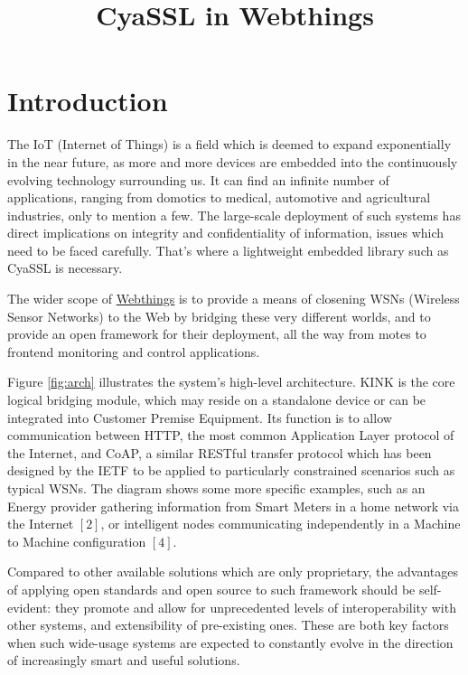 \documentclass[10pt]{article}
\title{\textbf{CyaSSL in Webthings}}
\author{}
\date{}
\begin{document}
\maketitle

\section{Introduction}

The IoT (Internet of Things) is a field which is deemed to expand exponentially in the near future, as more and more devices are embedded into the continuously evolving technology surrounding us. It can find an infinite number of applications, ranging from domotics to medical, automotive and agricultural industries, only to mention a few. The large-scale deployment of such systems has direct implications on integrity and confidentiality of information, issues which need to be faced carefully. That's where a lightweight embedded library such as CyaSSL is necessary.

The wider scope of \href{http://github.com/koanlogic/webthings}{Webthings} is to provide a means of closening WSNs (Wireless Sensor Networks) to the Web by bridging these very different worlds, and to provide an open framework for their deployment, all the way from motes to frontend monitoring and control applications.

Figure \ref{fig:arch} illustrates the system's high-level architecture. KINK is the core logical bridging module, which may reside on a standalone device or can be integrated into Customer Premise Equipment. Its function is to allow communication between HTTP, the most common Application Layer protocol of the Internet, and CoAP, a similar RESTful transfer protocol which has been designed by the IETF to be applied to particularly constrained scenarios such as typical WSNs. 
The diagram shows some more specific examples, such as an Energy provider gathering information from Smart Meters in a home network via the Internet $[2]$, or intelligent nodes communicating independently in a Machine to Machine configuration $[4]$.

Compared to other available solutions which are only proprietary, the advantages of applying open standards and open source to such framework should be self-evident: they promote and allow for unprecedented levels of interoperability with other systems, and extensibility of pre-existing ones. These are both key factors when such wide-usage systems are expected to constantly evolve in the direction of increasingly smart and useful solutions.
\end{document}
